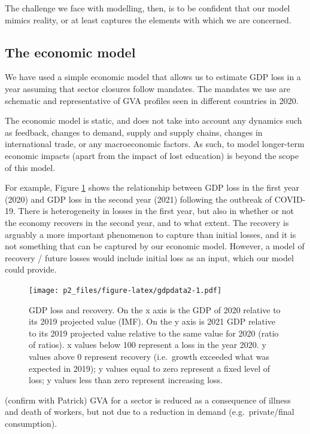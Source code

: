 \documentclass[
]{article}
\begin{document}
The challenge we face with modelling, then, is to be confident that our model mimics reality, or at least captures the elements with which we are concerned.

\hypertarget{the-economic-model}{%
\subsection{The economic model}\label{the-economic-model}}

We have used a simple economic model that allows us to estimate GDP loss in a year assuming that sector closures follow mandates. The mandates we use are schematic and representative of GVA profiles seen in different countries in 2020.

The economic model is static, and does not take into account any dynamics such as feedback, changes to demand, supply and supply chains, changes in international trade, or any macroeconomic factors. As such, to model longer-term economic impacts (apart from the impact of lost education) is beyond the scope of this model.

For example, Figure \ref{fig:gdpdata2} shows the relationship between GDP loss in the first year (2020) and GDP loss in the second year (2021) following the outbreak of COVID-19. There is heterogeneity in losses in the first year, but also in whether or not the economy recovers in the second year, and to what extent. The recovery is arguably a more important phenomenon to capture than initial losses, and it is not something that can be captured by our economic model. However, a model of recovery / future losses would include initial loss as an input, which our model could provide.

\begin{figure}
\centering
\texttt{[image: p2\_files/figure-latex/gdpdata2-1.pdf]}
\caption{\label{fig:gdpdata2}GDP loss and recovery. On the x axis is the GDP of 2020 relative to its 2019 projected value (IMF). On the y axis is 2021 GDP relative to its 2019 projected value relative to the same value for 2020 (ratio of ratios). x values below 100 represent a loss in the year 2020. y values above 0 represent recovery (i.e.~growth exceeded what was expected in 2019); y values equal to zero represent a fixed level of loss; y values less than zero represent increasing loss.}
\end{figure}

(confirm with Patrick) GVA for a sector is reduced as a consequence of illness and death of workers, but not due to a reduction in demand (e.g.~private/final consumption).
\end{document}
